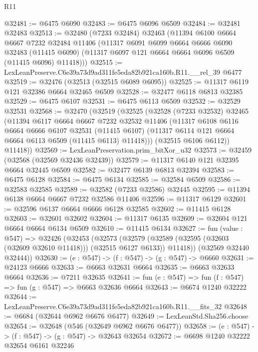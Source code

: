 \begin{lexlean}{R11}
\begin{coremodule}
@32481 := @6475 @6090
@32483 := @6475 @6096 @6509
@32484 := @32481 @32483
@32513 := @32480
    (@7233 @32484)
    @32463
    (@11394
      @6100
      @6664
      @6667
      @7232
      @32484
      @11406
      (@11317
        @6091
        @6099
        @6664
        @6666
        @6090
        @32483
        (@11415 @6090)
        (@11317 @6097 @121 @6664 @6664 @6096 @6509 (@11415 @6096) @11418)))
@32515 := LexLeanPreserve.C6e39a73d9ad311fe5eda82b921ca160b.R11.__rel_39 @6477
@32519 := @32476 (@32513 (@32515 @6089 @6095))
@32525 := @11317 @6119 @121 @32386 @6664 @32465 @6509
@32528 := @32477 @6118 @6813 @32385
@32529 := @6475 @6107
@32531 := @6475 @6113 @6509
@32532 := @32529 @32531
@32568 := @32470
    (@32519
      (@32525
        (@32528
          (@7233 @32532)
          @32465
          (@11394
            @6117
            @6664
            @6667
            @7232
            @32532
            @11406
            (@11317
              @6108
              @6116
              @6664
              @6666
              @6107
              @32531
              (@11415 @6107)
              (@11317 @6114 @121 @6664 @6664 @6113 @6509 (@11415 @6113) @11418)))
          (@32515 @6106 @6112))
        @11418))
@32569 := LexLeanPreservation.prim_bitXor_u32
@32573 := @32459 (@32568 (@32569 @32436 @32439))
@32579 := @11317 @6140 @121 @32395 @6664 @32445 @6509
@32582 := @32477 @6139 @6813 @32394
@32583 := @6475 @6128
@32584 := @6475 @6134
@32585 := @32584 @6509
@32586 := @32583 @32585
@32589 := @32582 (@7233 @32586) @32445
@32595 := @11394 @6138 @6664 @6667 @7232 @32586 @11406
@32596 := @11317 @6129
@32601 := @32596 @6137 @6664 @6666 @6128 @32585
@32602 := @11415 @6128
@32603 := @32601 @32602
@32604 := @11317 @6135
@32609 := @32604 @121 @6664 @6664 @6134 @6509
@32610 := @11415 @6134
@32627 := fun (value : @547) =>
  @32426
    (@32453
      (@32573
        (@32579 (@32589 (@32595 (@32603 (@32609 @32610 @11418))) (@32515 @6127 @6133)) @11418))
      (@32569 @32440 @32444))
@32630 := (e : @547) -> (f : @547) -> (g : @547) -> @6660
@32631 := @24123 @6666
@32633 := @6663 @32631 @6664
@32635 := @6663 @32633 @6664
@32636 := @7211 @32635
@32641 := fun (e : @547) => fun (f : @547) => fun (g : @547) => @6663 @32636 @6664
@32643 := @6674 @1240 @32222
@32644 := LexLeanPreserve.C6e39a73d9ad311fe5eda82b921ca160b.R11.__fits_32
@32648 := @6684 (@32644 @6962 @6676 @6477)
@32649 := LexLeanStd.Sha256.choose
@32654 := @32648 (@546 (@32649 @6962 @6676 @6477))
@32658 := (e : @547) -> (f : @547) -> (g : @547) -> @32643 @32654
@32672 := @6698
    @1240
    @32222
    @32654
    @6161
    @32246

\end{coremodule}
\end{lexlean}
